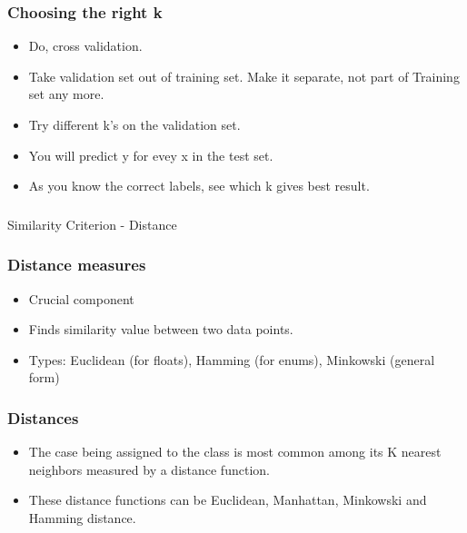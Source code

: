 \begin{frame}[fragile] \frametitle{Choosing the right k}
\begin{itemize}
\item Do, cross validation.
\item Take validation set out of training set. Make it separate, not part of Training set any more.
\item Try different k's on the validation set.
\item You will predict y for evey x in the test set.
\item As you know the correct labels, see which k gives best result.
\end{itemize}
\end{frame}

\begin{frame}[fragile]\frametitle{}
\begin{center}
{\Large Similarity Criterion - Distance}
\end{center}
\end{frame}


\begin{frame}[fragile]\frametitle{Distance measures }
\begin{itemize}
\item Crucial component
\item Finds similarity value between two data points.
\item Types: Euclidean (for floats), Hamming (for enums), Minkowski (general form)
\end{itemize}
\end{frame}

\begin{frame}[fragile]\frametitle{Distances}
\begin{itemize}
\item The case being assigned to the class is most common among its K nearest neighbors measured by a distance
function.
\item These distance functions can be Euclidean, Manhattan, Minkowski and Hamming distance.
\end{itemize}
\end{frame}

